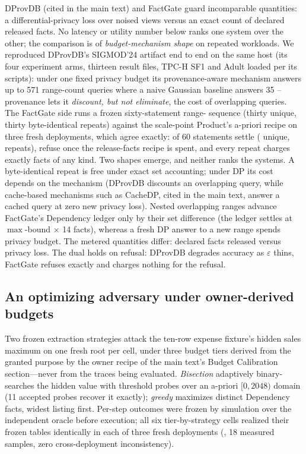 \documentclass[journal,onecolumn]{IEEEtran}
\newcommand{\code}[1]{\texttt{\detokenize{#1}}}
\begin{document}
DProvDB (cited in the main text) and FactGate guard incomparable quantities: a
differential-privacy loss over noised views versus an exact count of
declared released facts. No latency or utility number below ranks one
system over the other; the comparison is of \emph{budget-mechanism
shape} on repeated workloads. We reproduced DProvDB's SIGMOD'24 artifact
end to end on the same host (its four experiment arms, thirteen result
files, TPC-H SF1 and Adult loaded per its scripts): under one fixed
privacy budget its provenance-aware mechanism answers up to 571
range-count queries where a naive Gaussian baseline answers 35 --
provenance lets it \emph{discount, but not eliminate}, the cost of
overlapping queries. The FactGate side runs a frozen sixty-statement
range-\code{SUM} sequence (thirty unique, thirty byte-identical repeats)
against the scale-point Product's a-priori recipe on three fresh
deployments, which agree exactly: \FinalVFiveCompareAccepted{} of 60
statements settle (\FinalVFiveCompareUniqueAccepted{} unique,
\FinalVFiveCompareRepeatsAccepted{} repeats),
\FinalVFiveCompareBudgetRefusals{} refuse once the release-facts recipe
is spent, and every repeat charges exactly
\FinalVFiveCompareRepeatCharges{} facts of any kind. Two shapes emerge, and neither
ranks the systems. A byte-identical repeat is free under exact set
accounting; under DP its cost depends on the mechanism (DProvDB discounts an
overlapping query, while cache-based mechanisms such as CacheDP, cited in
the main text, answer a cached query at zero new privacy loss). Nested
overlapping ranges advance FactGate's Dependency ledger only by their set
difference (the ledger settles at $\max$-bound $\times$ 14 facts), whereas
a fresh DP answer to a new range spends privacy budget. The metered
quantities differ: declared facts released versus privacy loss.
The dual holds on refusal: DProvDB degrades accuracy as
$\varepsilon$ thins, FactGate refuses exactly and charges nothing for the
refusal.

\subsection{An optimizing adversary under owner-derived budgets}
\label{sec:adversary-supp}

Two frozen extraction strategies attack the ten-row expense fixture's
hidden sales maximum on one fresh root per cell, under three budget tiers
derived from the granted purpose by the owner recipe of the main text's
Budget Calibration section---never from the traces being evaluated.
\emph{Bisection} adaptively binary-searches the hidden value with
\code{count(*)} threshold probes over an a-priori $[0,2048)$ domain (11
accepted probes recover it exactly); \emph{greedy} maximizes distinct
Dependency facts, widest listing first. Per-step outcomes were frozen by
simulation over the independent oracle before execution; all six
tier-by-strategy cells realized their frozen tables identically in each of
three fresh deployments (\code{pilot-adversary-05}, 18 measured samples,
zero cross-deployment inconsistency).
\end{document}
